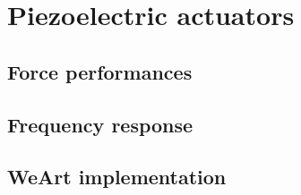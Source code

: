 \section{Piezoelectric actuators}

\subsection{Force performances}

\subsection{Frequency response}

\subsection{WeArt implementation}
